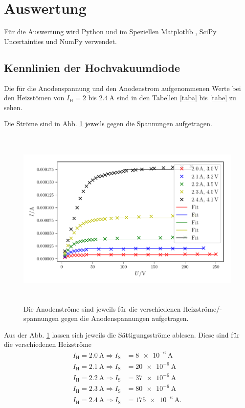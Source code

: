 \section{Auswertung}
\label{sec:Auswertung}

Für die Auswertung wird Python und im Speziellen Matplotlib \cite{matplotlib}, SciPy \cite{scipy}
Uncertainties \cite{uncertainties} und NumPy \cite{numpy}verwendet.

\subsection{Kennlinien der Hochvakuumdiode}
\label{sec:a}
Die für die Anodenspannung und den Anodenstrom aufgenommenen Werte
bei den Heizstömen von $I_\text{H} = \num{2}$ bis $\SI{2.4}{\ampere}$
sind in den Tabellen \ref{taba} bis \ref{tabe} zu sehen.







\noindent Die Ströme sind in Abb. \ref{fig:plot1} jeweils gegen die Spannungen
aufgetragen.
\begin{figure}
    \centering
    \includegraphics[width=15cm, height=9cm]{build/plot1.pdf}
    \caption{Die Anodenströme sind jeweils für die verschiedenen Heizströme/-spannungen
    gegen die Anodenspannungen aufgetragen.}
    \label{fig:plot1}
\end{figure}

\noindent Aus der Abb. \ref{fig:plot1} lassen sich jeweils
die Sättigungsströme ablesen. Diese sind für die verschiedenen
Heizströme
\begin{align*}
    I_\text{H} = \SI{2.0}{\ampere} \Rightarrow I_\text{S} &= \SI{8e-6}{\ampere} \\
    I_\text{H} = \SI{2.1}{\ampere} \Rightarrow I_\text{S} &= \SI{20e-6}{\ampere} \\
    I_\text{H} = \SI{2.2}{\ampere} \Rightarrow I_\text{S} &= \SI{37e-6}{\ampere} \\
    I_\text{H} = \SI{2.3}{\ampere} \Rightarrow I_\text{S} &= \SI{80e-6}{\ampere} \\
    I_\text{H} = \SI{2.4}{\ampere} \Rightarrow I_\text{S} &= \SI{175e-6}{\ampere}.
\end{align*}


